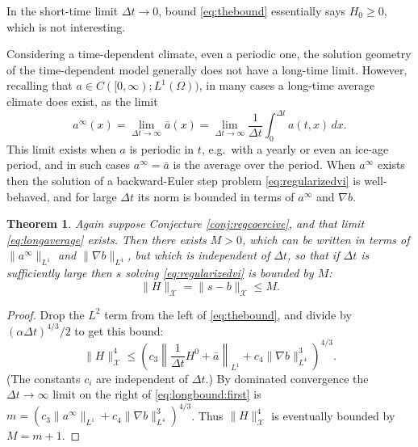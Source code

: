 \documentclass[12pt]{article}
\newtheorem{theorem}{Theorem}
\newcommand{\cX}{\ensuremath{\mathcal{X}}}
\newcommand{\grad}{\ensuremath{\nabla}}
\begin{document}
In the short-time limit $\Delta t\to 0$, bound \eqref{eq:thebound} essentially says $H_0\ge 0$, which is not interesting.

Considering a time-dependent climate, even a periodic one, the solution geometry of the time-dependent model \cite{Bueler2025} generally does not have a long-time limit.  However, recalling that $a \in C([0,\infty); L^1(\Omega))$, in many cases a long-time average climate does exist, as the limit
\begin{equation}
a^\infty(x) = \lim_{\Delta t \to \infty} \bar a(x) = \lim_{\Delta t \to \infty} \frac{1}{\Delta t} \int_0^{\Delta t} a(t,x)\,dx. \label{eq:longaverage}
\end{equation}
This limit exists when $a$ is periodic in $t$, e.g.~with a yearly or even an ice-age period, and in such cases $a^\infty = \bar a$ is the average over the period.  When $a^\infty$ exists then the solution of a backward-Euler step problem \eqref{eq:regularizedvi} is well-behaved, and for large $\Delta t$ its norm is bounded in terms of $a^\infty$ and $\grad b$.

\begin{theorem}
Again suppose Conjecture \ref{conj:regcoercive}, and that limit \eqref{eq:longaverage} exists.  Then there exists $M>0$, which can be written in terms of $\|a^\infty\|_{L^1}$ and $\|\grad b\|_{L^4}$, but which is independent of $\Delta t$, so that if $\Delta t$ is sufficiently large then $s$ solving \eqref{eq:regularizedvi} is bounded by $M$:
\begin{equation}
\|H\|_{\cX} = \|s-b\|_{\cX} \le M.  \label{eq:longbound}
\end{equation}
\end{theorem}

\begin{proof}
Drop the $L^2$ term from the left of \eqref{eq:thebound}, and divide by $(\alpha \Delta t)^{4/3}/2$ to get this bound:
\begin{equation}
\|H\|_{\cX}^4 \le \left(c_3 \left\|\frac{1}{\Delta t} H^0+\bar a\right\|_{L^1} + c_4 \|\grad b\|_{L^4}^3\right)^{4/3}. \label{eq:longbound:first}
\end{equation}
(The constants $c_i$ are independent of $\Delta t$.)  By dominated convergence the $\Delta t\to\infty$ limit on the right of \eqref{eq:longbound:first} is $m=\left(c_3 \|a^\infty\|_{L^1}  + c_4 \|\grad b\|_{L^4}^3\right)^{4/3}$.  Thus $\|H\|_{\cX}^4$ is eventually bounded by $M=m+1$.
\end{proof}


{\small


}
\end{document}
